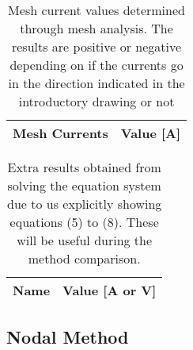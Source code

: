 \begin{table}[hbt!]
  \centering
  \begin{tabular}{|c|c|}
    \hline    
    {\bf Mesh Currents} & {\bf Value [A]} \\ \hline
    
  \end{tabular}
  \caption{Mesh current values determined through mesh analysis. The results are positive or negative depending on if the currents go in the direction indicated in the introductory drawing or not}
  \label{tab:mesh}
\end{table}

\begin{table}[hbt!]
  \centering
  \begin{tabular}{|c|c|}
    \hline    
    {\bf Name} & {\bf Value [A or V]} \\ \hline
    
  \end{tabular}
  \caption{Extra results obtained from solving the equation system due to us explicitly showing equations (5) to (8). These will be useful during the method comparison.}
  \label{tab:mesh}
\end{table}




\subsection{Nodal Method}
\par

